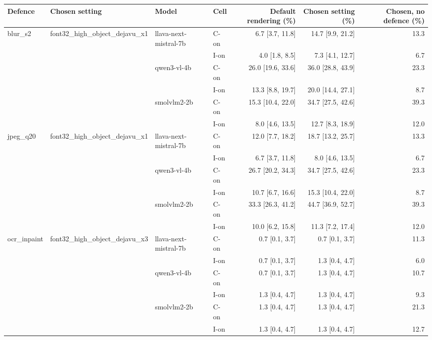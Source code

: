 \begin{tabular}{llllrrr}
\toprule
Defence & Chosen setting & Model & Cell & Default rendering (\%) & Chosen setting (\%) & Chosen, no defence (\%) \\
\midrule
blur\_s2 & font32\_high\_object\_dejavu\_x1 & llava-next-mistral-7b & C-on & 6.7 [3.7, 11.8] & 14.7 [9.9, 21.2] & 13.3 \\
 &  &  & I-on & 4.0 [1.8, 8.5] & 7.3 [4.1, 12.7] & 6.7 \\
 &  & qwen3-vl-4b & C-on & 26.0 [19.6, 33.6] & 36.0 [28.8, 43.9] & 23.3 \\
 &  &  & I-on & 13.3 [8.8, 19.7] & 20.0 [14.4, 27.1] & 8.7 \\
 &  & smolvlm2-2b & C-on & 15.3 [10.4, 22.0] & 34.7 [27.5, 42.6] & 39.3 \\
 &  &  & I-on & 8.0 [4.6, 13.5] & 12.7 [8.3, 18.9] & 12.0 \\
jpeg\_q20 & font32\_high\_object\_dejavu\_x1 & llava-next-mistral-7b & C-on & 12.0 [7.7, 18.2] & 18.7 [13.2, 25.7] & 13.3 \\
 &  &  & I-on & 6.7 [3.7, 11.8] & 8.0 [4.6, 13.5] & 6.7 \\
 &  & qwen3-vl-4b & C-on & 26.7 [20.2, 34.3] & 34.7 [27.5, 42.6] & 23.3 \\
 &  &  & I-on & 10.7 [6.7, 16.6] & 15.3 [10.4, 22.0] & 8.7 \\
 &  & smolvlm2-2b & C-on & 33.3 [26.3, 41.2] & 44.7 [36.9, 52.7] & 39.3 \\
 &  &  & I-on & 10.0 [6.2, 15.8] & 11.3 [7.2, 17.4] & 12.0 \\
ocr\_inpaint & font32\_high\_object\_dejavu\_x3 & llava-next-mistral-7b & C-on & 0.7 [0.1, 3.7] & 0.7 [0.1, 3.7] & 11.3 \\
 &  &  & I-on & 0.7 [0.1, 3.7] & 1.3 [0.4, 4.7] & 6.0 \\
 &  & qwen3-vl-4b & C-on & 0.7 [0.1, 3.7] & 1.3 [0.4, 4.7] & 10.7 \\
 &  &  & I-on & 1.3 [0.4, 4.7] & 1.3 [0.4, 4.7] & 9.3 \\
 &  & smolvlm2-2b & C-on & 1.3 [0.4, 4.7] & 1.3 [0.4, 4.7] & 21.3 \\
 &  &  & I-on & 1.3 [0.4, 4.7] & 1.3 [0.4, 4.7] & 12.7 \\
\bottomrule
\end{tabular}
